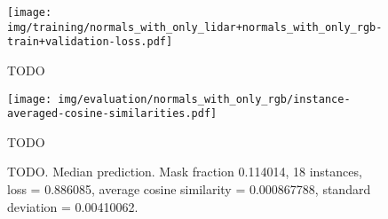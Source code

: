 \begin{figure}[H]
  \texttt{[image: img/training/normals\_with\_only\_lidar+normals\_with\_only\_rgb-train+validation-loss.pdf]}
  \caption{TODO}
\end{figure}

\begin{figure}[H]
  \texttt{[image: img/evaluation/normals\_with\_only\_rgb/instance-averaged-cosine-similarities.pdf]}
  \caption{TODO}
\end{figure}

\begin{figure}[H]
  \caption{%
    TODO.
    Median prediction.
    Mask fraction \num{0.114014}, 18 instances, loss = \num{0.886085}, average cosine similarity = \num{0.000867788}, standard deviation = \num{0.00410062}.
  }
\end{figure}
